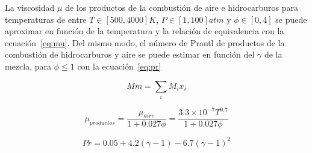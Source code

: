 La viscosidad $\mu$ de los productos de la combustión de aire e hidrocarburos
para temperaturas de entre $T\in [500, 4000]K$, $P\in[1, 100]atm$ y
$\phi \in [0,4]$ se puede aproximar en función de la temperatura y la relación
de equivalencia con la ecuación~\ref{eq:mu}.
%
Del mismo modo, el número de Prantl de productos de la combustión de
hidrocarburos y aire se puede estimar en función del $\gamma$ de la mezcla, para
$\phi\leq 1$ con la  ecuación~\ref{eq:pr}

\begin{equation}\label{eq:mw}
  Mm = \sum_{i} M_{i}x_{i}
\end{equation}

\begin{equation}\label{eq:mu}
  \mu_{productos} = \frac{\mu_{aire}} {1 + 0.027 \phi} = \frac{3.3\times 10^{-7} T^{0.7}} {1 + 0.027 \phi}
\end{equation}


\begin{equation}\label{eq:pr}
    Pr = 0.05 + 4.2 (\gamma - 1) - 6.7 {(\gamma - 1)}^{2}
\end{equation}
